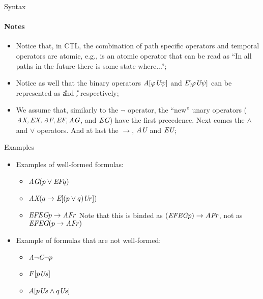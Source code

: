 \begin{frame}{Syntax}
	\framesubtitle{Notes}
	\begin{itemize}
		\item 
		{
			Notice that, in CTL, the combination of path specific operators and temporal operators are atomic, e.g., \A\F \; is an atomic operator that can be read as ``In all paths in the future there is some state where...'';
			\pause
		}
		
		\item 
		{
			Notice as well that the binary operators $\textit{A}[\varphi\textit{U}\psi]$ and $\textit{E}[\varphi\textit{U}\psi]$ can be represented as \A\U and \E\U, respectively;
			\pause
		}
		
		\item 
		{
			We assume that, similarly to the $\neg$ operator, the ``new'' unary operators ($\textit{A}\textit{X}, \textit{E}\textit{X}, \textit{A}\textit{F}, \textit{E}\textit{F}, \textit{A}\textit{G} $, and $ \textit{E}\textit{G} $) have the first precedence. Next comes the $\land$ and $\lor$ operators. And at last the $\to$, $\textit{A}\textit{U}$ and $\textit{E}\textit{U}$;
		}
	\end{itemize}
	
\end{frame}

\begin{frame}{Examples}
	\begin{itemize}
		\item
		{
			Examples of well-formed formulas:
			\begin{itemize}
				\item $\textit{A}\textit{G} (p \lor \textit{E}\textit{F} q)$ \pause
				\item $\textit{A}\textit{X} (q \to \textit{E}[(p\lor q) \textit{U} r])$ \pause
				\item $\textit{E}\textit{F}\textit{E}\textit{G} p \to \textit{A}\textit{F} r$ Note that this is binded as $(\textit{E}\textit{F}\textit{E}\textit{G} p) \to \textit{A}\textit{F} r$, not as $\textit{E}\textit{F}\textit{E}\textit{G} (p \to \textit{A}\textit{F} r)$
			\end{itemize}
			\pause
		}
		\item
		{
			Example of formulas that are not well-formed:
			\begin{itemize}
				\item $\textit{A}\neg\textit{G} \neg p$ \pause
				\item $F[p\textit{U} s]$ \pause
				\item $A[p\textit{U} s \land q \textit{U} s]$
			\end{itemize}
		}
	\end{itemize}
\end{frame}

